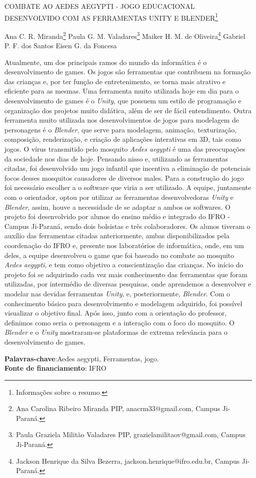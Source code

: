 \documentclass[article,12pt,onesidea,4paper,english,brazil]{abntex2}
\begin{document}
	
	
	\frenchspacing 
	
	\begin{center}
		\LARGE COMBATE AO AEDES AEGYPTI - JOGO EDUCACIONAL DESENVOLVIDO COM
		AS FERRAMENTAS UNITY E BLENDER\footnote{Informações sobre o resumo.}
		
		\normalsize
		Ana C. R. Miranda\footnote{Ana Carolina Ribeiro Miranda PIP, anacrm33@gmail.com, Campus Ji-Paraná.} 
	Paula G. M. Valadares\footnote{Paula Graziela Militão Valadares PIP, grazielamilitaov@gmail.com, Campus Ji-Paraná.} 
		Maiker H. M. de Oliveira\footnote{Jackson Henrique da Silva Bezerra, jackson.henrique@ifro.edu.br, Campus Ji-Paraná.} 
		Gabriel P. F. dos Santos
		Eisen G. da Foncesa
	\end{center}
	
	\noindent Atualmente, um dos principais ramos do mundo da informática é o
	desenvolvimento de games. Os jogos são ferramentas que contribuem na formação
	das crianças e, por ter função de entretenimento, se torna mais atrativo e eficiente
	para as mesmas. Uma ferramenta muito utilizada hoje em dia para o
	desenvolvimento de games é o \textit{Unity}, que possuem um estilo de programação e
	organização dos projetos muito didática, além de ser de fácil entendimento. Outra
	ferramenta muito utilizada nos desenvolvimentos de jogos para modelagem de
	personagens é o \textit{Blender}, que serve para modelagem, animação, texturização,
	composição, renderização, e criação de aplicações interativas em 3D, tais como
	jogos. O vírus transmitido pelo mosquito \textit{Aedes aegypti} é uma das preocupações da
	sociedade nos dias de hoje. Pensando nisso e, utilizando as ferramentas citadas, foi
	desenvolvido um jogo infantil que incentiva a eliminação de potenciais focos desses
	mosquitos causadores de diversos males. Para a construção do jogo foi necessário
	escolher a o software que viria a ser utilizado. A equipe, juntamente com o
	orientador, optou por utilizar as ferramentas desenvolvedoras \textit{Unity} e \textit{Blender},
	assim, houve a necessidade de se adaptar a ambos os softwares. O projeto foi
	desenvolvido por alunos do ensino médio e integrado do IFRO - Campus Ji-Paraná,
	sendo dois bolsistas e três colaboradores. Os alunos tiveram o auxílio das
	ferramentas citadas anteriormente, ambas disponibilizados pela coordenação do
	IFRO e, presente nos laboratórios de informática, onde, em um deles, a equipe
	desenvolveu o game que foi baseado no combate ao mosquito \textit{Aedes aegypti}, e tem
	como objetivo a conscientização das crianças. No início do projeto foi se adquirindo
	cada vez mais conhecimento das ferramentas que foram utilizadas, por intermédio
	de diversas pesquisas, onde aprendemos a desenvolver e modelar nas devidas
	ferramentas \textit{Unity}, e, posteriormente, \textit{Blender}. Com o conhecimento básico para
	desenvolvimento e modelagem adquirido, foi possível visualizar o objetivo final. Após
	isso, junto com a orientação do professor, definimos como seria o personagem e a
	interação com o foco do mosquito. O \textit{Blender} e o \textit{Unity} mostraram-se plataformas de
	extrema relevância para o desenvolvimento de games.
	
	\vspace{\onelineskip}
	
	\noindent
	\textbf{Palavras-chave}:Aedes aegypti, Ferramentas, jogo. \\
	\textbf{Fonte de financiamento}: IFRO
	
\end{document}
